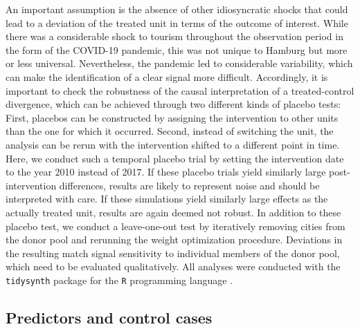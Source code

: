 \documentclass[a4paper, 12pt]{article}
\begin{document}
An important assumption is the absence of other idiosyncratic shocks that could lead to a deviation of the treated unit in terms of the outcome of interest. While there was a considerable shock to tourism throughout the observation period in the form of the COVID-19 pandemic, this was not unique to Hamburg but more or less universal. Nevertheless, the pandemic led to considerable variability, which can make the identification of a clear signal more difficult. Accordingly, it is important to check the robustness of the causal interpretation of a treated-control divergence, which can be achieved through two different kinds of placebo tests: First, placebos can be constructed by assigning the intervention to other units than the one for which it occurred. Second, instead of switching the unit, the analysis can be rerun with the intervention shifted to a different point in time. Here, we conduct such a temporal placebo trial by setting the intervention date to the year 2010 instead of 2017. If these placebo trials yield similarly large post-intervention differences, results are likely to represent noise and should be interpreted with care. If these simulations yield similarly large effects as the actually treated unit, results are again deemed not robust. In addition to these placebo test, we conduct a leave-one-out test \citep{abadie2010} by iteratively removing cities from the donor pool and rerunning the weight optimization procedure. Deviations in the resulting match signal sensitivity to individual members of the donor pool, which need to be evaluated qualitatively. All analyses were conducted with the \texttt{tidysynth} package for the \texttt{R} programming language \citep{dunford2025}.


\subsection{Predictors and control cases}
\end{document}
